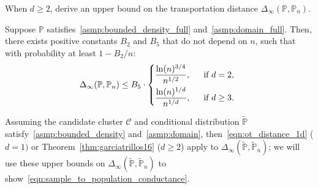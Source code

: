 \documentclass[twoside,11pt]{article}
\newcommand{\1}{\mathbf{1}}
\newcommand{\mc}[1]{\mathcal{#1}}
\newcommand{\mbb}[1]{\mathbb{#1}}
\newcommand{\Pbb}{\mathbb{P}}
\newcommand{\wt}[1]{\widetilde{#1}}
\begin{document}
When $d \geq 2$, \cite{garciatrillos16b} derive an upper bound on the transportation distance $\Delta_{\infty}(\mbb{P},\mbb{P}_n)$.
\begin{theorem}
	\label{thm:garciatrillos16}
	Suppose $\Pbb$ satisfies~\ref{asmp:bounded_density_full} and~\ref{asmp:domain_full}. Then, there exists positive constants $B_{2}$ and $B_5$ that do not depend on $n$, such that with probability at least $1 - B_2/n$:
	\begin{equation*}
	\Delta_{\infty}(\mbb{P},\mbb{P}_n) \leq B_5 \cdot 
	\begin{dcases*}
	\frac{\ln(n)^{3/4}}{n^{1/2}},&~~\textrm{if $d = 2$,} \\
	\frac{\ln(n)^{1/d}}{n^{1/d}},&~~\textrm{if $d \geq 3$.}
	\end{dcases*}
	\end{equation*}
\end{theorem}
Assuming the candidate cluster $\mc{C}$ and conditional distribution $\wt{\Pbb}$ satisfy~\ref{asmp:bounded_density} and~\ref{asmp:domain}, then~\eqref{eqn:ot_distance_1d} ($d = 1)$ or Theorem~\ref{thm:garciatrillos16} ($d \geq 2$) apply to $\Delta_{\infty}(\wt{\Pbb},\wt{\Pbb}_n)$; we will use these upper bounds on $\Delta_{\infty}(\wt{\Pbb},\wt{\Pbb}_n)$ to show~\eqref{eqn:sample_to_population_conductance}.\\
\end{document}
